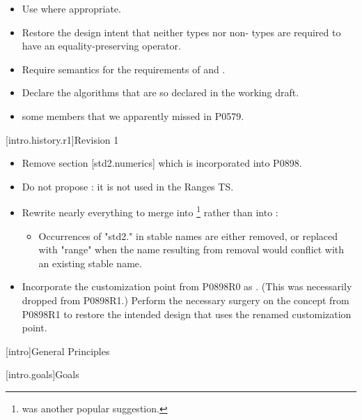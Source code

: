\begin{itemize}
\item Use  where appropriate.

\item Restore the design intent that neither  types nor
  non-  types are required to have an
  equality-preserving \tcode{*} operator.

\item Require semantics for the  requirements of
   and
  .

\item Declare  the algorithms that are so declared in the
  working draft.

\item {} some  members that we apparently
  missed in P0579.
\end{itemize}

[intro.history.r1]{Revision 1}
\begin{itemize}
\item Remove section [std2.numerics] which is incorporated into P0898.

\item Do not propose : it is not used in the Ranges TS.

\item Rewrite nearly everything to merge into \footnote{
was another popular suggestion.} rather than into :
  \begin{itemize}
  \item Occurrences of "std2." in stable names are either removed, or replaced with
    "range" when the name resulting from removal would conflict with an existing
    stable name.
  \end{itemize}

\item Incorporate the  customization point from P0898R0 as
. (This was necessarily dropped from P0898R1.) Perform the
necessary surgery on the  concept from P0898R1 to restore the
intended design that uses the renamed customization point.

\end{itemize}

[intro]{General Principles}

[intro.goals]{Goals}

